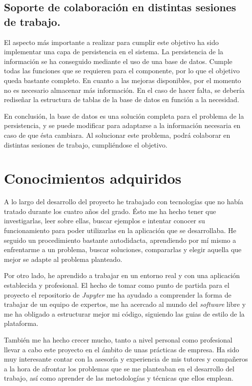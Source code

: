 \documentclass[11pt,spanish,listoffigures]{tfgetsinf}
\begin{document}
\subsection{Soporte de colaboración en distintas sesiones de trabajo.}
\label{subsec:objetivos-conc-persistir}

El aspecto más importante a realizar para cumplir este objetivo ha sido implementar una capa de persistencia en el sistema. La persistencia de la información se ha conseguido mediante el uso de una base de datos. Cumple todas las funciones que se requieren para el componente, por lo que el objetivo queda bastante completo. En cuanto a las mejoras disponibles, por el momento no es necesario almacenar más información. En el caso de hacer falta, se debería rediseñar la estructura de tablas de la base de datos en función a la necesidad. 

En conclusión, la base de datos es una solución completa para el problema de la persistencia, y se puede modificar para adaptarse a la información necesaria en caso de que ésta cambiara. Al solucionar este problema, podrá colaborar en distintas sesiones de trabajo, cumpliéndose el objetivo.
 

\section{Conocimientos adquiridos}
\label{sec:conocimientos-adquiridos}

A lo largo del desarrollo del proyecto he trabajado con tecnologías que no había tratado durante los cuatro años del grado. Ésto me ha hecho tener que investigarlas, leer sobre ellas, buscar ejemplos e intentar conocer su funcionamiento para poder utilizarlas en la aplicación que se desarrollaba. He seguido un procedimiento bastante autodidacta, aprendiendo por mí mismo a enfrentarme a un problema, buscar soluciones, compararlas y elegir aquella que mejor se adapte al problema planteado.

Por otro lado, he aprendido a trabajar en un entorno real y con una aplicación establecida y profesional. El hecho de tomar como punto de partida para el proyecto el repositorio de \textit{Jupyter} me ha ayudado a comprender la forma de trabajar de un equipo de expertos, me ha acercado al mundo del \textit{software} libre y me ha obligado a estructurar mejor mi código, siguiendo las guias de estilo de la plataforma. 

También me ha hecho crecer mucho, tanto a nivel personal como profesional llevar a cabo este proyecto en el ámbito de unas prácticas de empresa. Ha sido muy interesante contar con la asesoría y experiencia de mis tutores y compañeros a la hora de afrontar los problemas que se me planteaban en el desarrollo del trabajo, así como aprender de las metodologías y técnicas que ellos emplean. 
\end{document}
